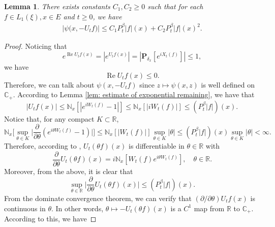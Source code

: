 \documentclass[12pt]{amsart}
\theoremstyle{plain}
\newtheorem{lem}[thm]{Lemma}
\theoremstyle{definition}
\numberwithin{equation}{section}
\begin{document}
\begin{lem}
    There exists constants $C_1, C_2\geq 0$ such that for each $f \in L_1(\xi),x\in E$ and $t\geq 0$, we have
\begin{align}
\label{eq: upper bound of psi(v)}
    \big|\psi\big(x,-U_tf\big)\big|
    \leq C_1 P^\beta_t |f|(x)+C_2 P^\beta_t |f| (x)^2.
\end{align}
\end{lem}
\begin{proof}
     Noticing that
\[
     e^{\operatorname{Re} U_tf(x)}
    = |e^{U_tf(x)}|
    = |\mathbf P_{\delta_x}[e^{i X_t(f)}]|
    \leq 1,
\]
    we have
\begin{equation}
\label{eq: -v has positive real part}
 \operatorname{Re} U_tf(x)
    \leq 0.
\end{equation}
    Therefore, we can talk about $\psi(x,-U_tf)$ since $z\mapsto \psi(x,z)$ is well defined on $\mathbb C_+$.
    According to Lemma \ref{lem: estimate of exponential remaining}, we have that
\begin{equation}
\label{eq: upper bound for vf}
    |U_tf(x)| \leq \mathbb N_x[|e^{i W_t(f)} - 1|]
    \leq \mathbb N_x[|i W_t(f)|]
    \leq (P^\beta_t |f|)(x).
\end{equation}
    Notice that, for any compact $K \subset \mathbb R$,
\begin{equation}
\label{eq: estimate of deriavetive of v(theta)}
    \mathbb N_x\Big[\sup_{\theta \in K} \Big|\frac{\partial}{\partial \theta} (e^{i\theta W_t(f)} - 1) \Big|\Big]
    \leq \mathbb N_x[|W_t(f)|] \sup_{\theta \in K}|\theta| \leq (P^\beta_t |f|)(x) \sup_{\theta \in K}|\theta| < \infty.
\end{equation}
    Therefore, according to \cite[Theorem A.5.2.]{Durrett2010Probability},
    $U_t(\theta f)(x)$ is differentiable in $\theta \in \mathbb R$ with
\[
    \frac{\partial}{\partial \theta} U_t(\theta f)(x)
    = i\mathbb N_x[W_t(f)e^{i\theta W_t(f)}],
    \quad \theta \in \mathbb R.
\]
    Moreover, from the above, it is clear that
\begin{equation}
\label{eq: upper bounded for derivative of v(theta)}
    \sup_{\theta \in \mathbb R}\Big| \frac{\partial}{\partial \theta}U_t(\theta f)(x)\Big|
    \leq ( P^\beta_t |f|)(x).
\end{equation}
    From the dominate convergence theorem, we can verify that $(\partial/\partial \theta)U_tf(x)$ is continuous in $\theta$.
    In other words, $\theta \mapsto -U_t(\theta f)(x)$ is a $C^1$ map from $\mathbb R$ to $\mathbb C_+$.
    According to this, we have

\end{proof}
\end{document}
